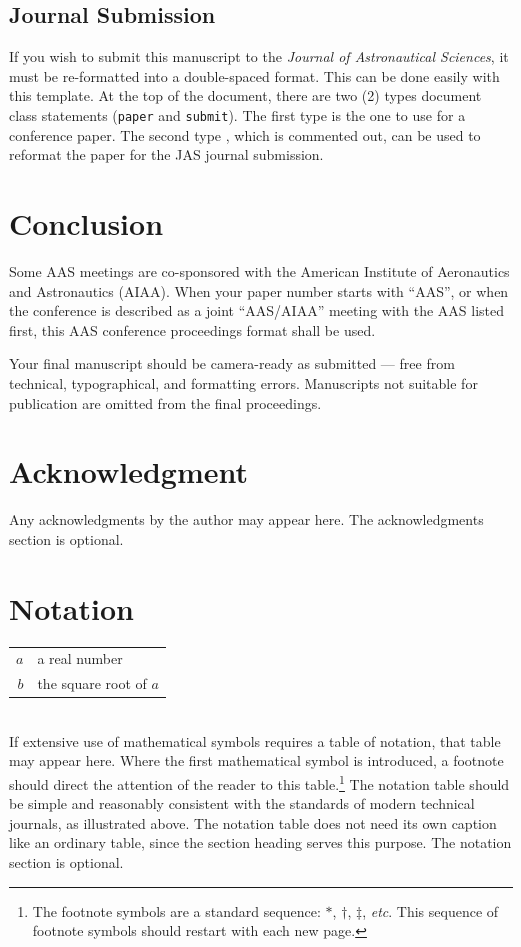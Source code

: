 \documentclass[letterpaper, preprint, paper,11pt]{AAS}	%
\begin{document}
\subsection{Journal Submission}
If you wish to submit this manuscript to the \emph{Journal of Astronautical Sciences}, it must be re-formatted into a double-spaced format. This can be done easily with this template. At the top of the document, there are two (2) types document class statements ({\tt paper} and {\tt submit}).  The first type is the one to use for a conference paper.  The second type , which is commented out, can be used to reformat the paper for the JAS journal submission.


\section{Conclusion}
Some AAS meetings are co-sponsored with the American Institute of Aeronautics and Astronautics (AIAA). When your paper number starts with ``AAS'', or when the conference is described as a joint ``AAS/AIAA'' meeting with the AAS listed first, this AAS conference proceedings format shall be used.

Your final manuscript should be camera-ready as submitted --- free from technical, typographical, and formatting errors. Manuscripts not suitable for publication are omitted from the final proceedings.


\section{Acknowledgment}
Any acknowledgments by the author may appear here. The acknowledgments section is optional.






\section{Notation}
\begin{tabular}{r l}
	$a$ & a real number \\
	$b$ &  the square root of $a$ \\
\end{tabular} \\

If extensive use of mathematical symbols requires a table of notation, that table may appear here. Where the first mathematical symbol is introduced, a footnote should direct the attention of the reader to this table.\footnote{The footnote symbols are a standard sequence: $\ast$, $\dagger$, $\ddag$, \emph{etc}. This sequence of footnote symbols should restart with each new page.}  The notation table should be simple and reasonably consistent with the standards of modern technical journals, as illustrated above. The notation table does not need its own caption like an ordinary table, since the section heading serves this purpose. The notation section is optional.
\end{document}
